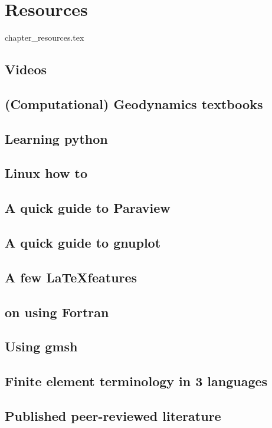 \chapter{Resources}

\begin{flushright} {\tiny {\color{gray} chapter\_resources.tex}} \end{flushright}

\section{Videos}  %
\section{(Computational) Geodynamics textbooks}  %
\section{Learning python}  %
\section{Linux how to}  %
\section{A quick guide to Paraview}\label{app:paraview}  %
\section{A quick guide to gnuplot}  %
\section{A few \LaTeX features}  %
\section{on using Fortran}  %
\section{Using gmsh \label{app:gmsh}}  %
\section{Finite element terminology in 3 languages}  %
\section{Published peer-reviewed literature}  %
